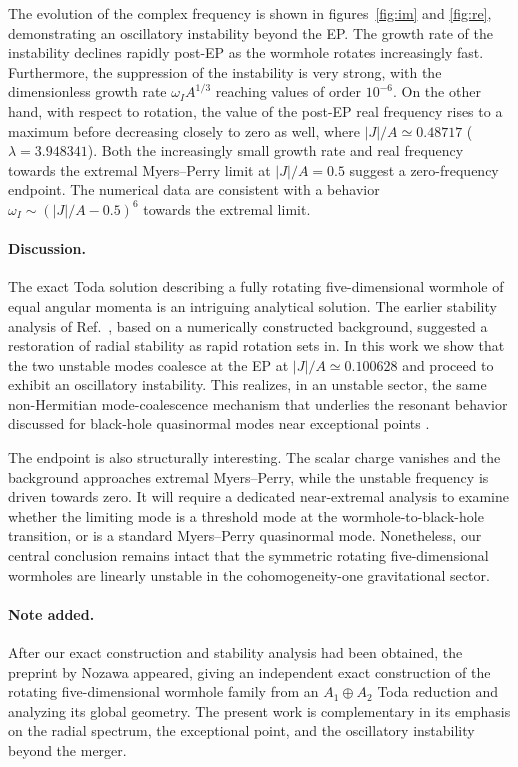 \documentclass[aps,prl,reprint,superscriptaddress,nofootinbib,floatfix]{revtex4-2}
\begin{document}
The evolution of the complex frequency is shown in figures~\ref{fig:im} and \ref{fig:re},
demonstrating an oscillatory instability beyond the EP.
The growth rate of the instability declines rapidly post-EP as the wormhole rotates increasingly fast.
Furthermore, 
the suppression of the instability is very strong, with the dimensionless growth rate $\omega_I A^{1/3}$
reaching values of order $10^{-6}$.
On the other hand, with respect to rotation, the value of the post-EP real frequency rises to a maximum before decreasing closely to zero as well,
where $|J|/A\simeq0.48717$ 
($\lambda=3.948341$). 
Both the increasingly small growth rate and real frequency towards the extremal Myers--Perry limit at $|J|/A=0.5$ suggest a zero-frequency endpoint.
The numerical data are consistent with a behavior
$\omega_I \sim (|J|/A-0.5)^6$ towards the extremal limit.

\paragraph{Discussion.}
The exact Toda solution describing a fully rotating five-dimensional wormhole of equal angular momenta is an intriguing analytical solution. 
The earlier stability analysis of Ref.~\cite{Dzhunushaliev:2013jja}, based on a numerically constructed background, suggested a restoration of radial stability as rapid rotation sets in.
In this work we show that the two unstable modes coalesce at the EP at 
$|J|/A\simeq0.100628$ and proceed to exhibit an oscillatory instability.
This realizes, in an unstable sector, the same non-Hermitian mode-coalescence mechanism that underlies the resonant behavior discussed for black-hole quasinormal modes near exceptional points \cite{Motohashi:2024fwt,Yang:2025dbn,PanossoMacedo:2025xnf,Kubota:2025hjk}.





The endpoint is also structurally interesting.  
The scalar charge vanishes and the background approaches extremal Myers--Perry, while the unstable frequency is driven towards zero.  
It will require a dedicated near-extremal analysis to examine whether the limiting mode is a threshold mode at the wormhole-to-black-hole transition, or is a standard Myers--Perry quasinormal mode.
Nonetheless, our central conclusion remains intact that the symmetric rotating five-dimensional wormholes are linearly unstable in the cohomogeneity-one gravitational sector.


\paragraph{Note added.}
After our exact construction and stability analysis had been obtained, the preprint by Nozawa \cite{Nozawa:2026} appeared, giving an independent exact construction of the rotating five-dimensional wormhole family from an $A_1\oplus A_2$ Toda reduction and analyzing its global geometry.  
The present work is complementary in its emphasis on the radial spectrum, the exceptional point, and the oscillatory instability beyond the merger.
\end{document}
